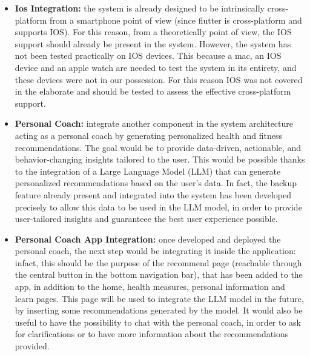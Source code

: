 \begin{itemize}[nosep] %
    \item \textbf{Ios Integration:} the system is already designed to be intrinsically cross-platform from a smartphone point of view (since flutter is cross-platform and supports IOS). For this reason, from a theoretically point of view, the IOS support should already be present in the system. However, the system has not been tested practically on IOS devices. This because a mac, an IOS device and an apple watch are needed to test the system in its entirety, and these devices were not in our possession. For this reason IOS was not covered in the elaborate and should be tested to assess the effective cross-platform support.
    \item \textbf{Personal Coach:} integrate another component in the system architecture acting as a personal coach by generating personalized health and fitness recommendations. The goal would be to provide data-driven, actionable, and behavior-changing insights tailored to the user. This would be possible thanks to the integration of a Large Language Model (LLM) that can generate personalized recommendations based on the user's data. In fact, the backup feature already present and integrated into the system has been developed precisely to allow this data to be used in the LLM model, in order to provide user-tailored insights and guaranteee the best user experience possible.
    \item \textbf{Personal Coach App Integration:} once developed and deployed the personal coach, the next step would be integrating it inside the application: infact, this should be the purpose of the recommend page (reachable through the central button in the bottom navigation bar), that has been added to the app, in addition to the home, health measures, personal information and learn pages. This page will be used to integrate the LLM model in the future, by inserting some recommendations generated by the model. It would also be useful to have the possibility to chat with the personal coach, in order to ask for clarifications or to have more information about the recommendations provided.
\end{itemize}